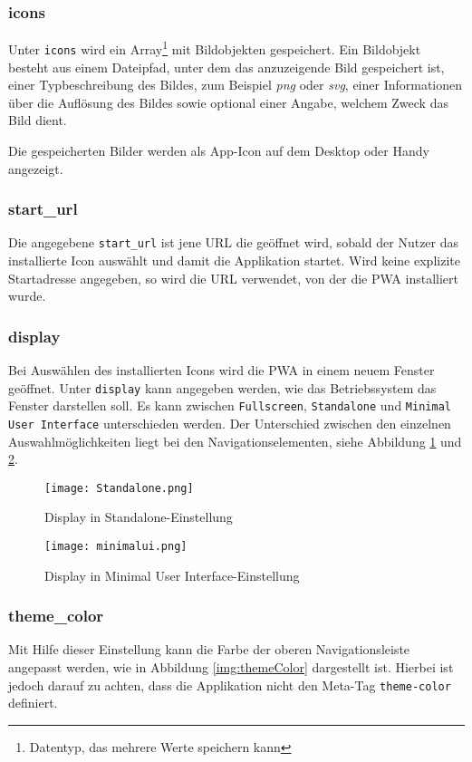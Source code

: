 \subsubsection{icons}
Unter \texttt{icons} wird ein Array\footnote{Datentyp, das mehrere Werte speichern kann} mit Bildobjekten gespeichert. Ein Bildobjekt besteht aus einem Dateipfad, unter dem das anzuzeigende Bild gespeichert ist, einer Typbeschreibung des Bildes, zum Beispiel \textit{png} oder \textit{svg}, einer Informationen über die Auflösung des Bildes sowie optional einer Angabe, welchem Zweck das Bild dient. 

Die gespeicherten Bilder werden als App-Icon auf dem Desktop oder Handy angezeigt. 

\subsubsection{start\_url}
Die angegebene \texttt{start\_url} ist jene \ac{URL} die geöffnet wird, sobald der Nutzer das installierte Icon auswählt und damit die Applikation startet. 
Wird keine explizite Startadresse angegeben, so wird die URL verwendet, von der die PWA installiert wurde. 

\subsubsection{display}

Bei Auswählen des installierten Icons wird die PWA in einem neuem Fenster geöffnet. Unter \texttt{display} kann angegeben werden, wie das Betriebssystem das Fenster darstellen soll. 
Es kann zwischen \texttt{Fullscreen}, \texttt{Standalone} und \texttt{Minimal User Interface} unterschieden werden. 
Der Unterschied zwischen den einzelnen Auswahlmöglichkeiten liegt bei den Navigationselementen, siehe Abbildung \ref{img:Standalone} und \ref{img:minimalui}.

\begin{figure}[!htb]
    \texttt{[image: Standalone.png]}
    \caption{Display in \glqq Standalone\grqq{}-Einstellung}
    \label{img:Standalone}
\end{figure}


\begin{figure}[!htb]
    \texttt{[image: minimalui.png]}
    \caption{Display in \glqq Minimal User Interface\grqq{}-Einstellung}
    \label{img:minimalui}
\end{figure}

\subsubsection{theme\_color}
Mit Hilfe dieser Einstellung kann die Farbe der oberen Navigationsleiste angepasst werden, wie in Abbildung \ref{img:themeColor} dargestellt ist. Hierbei ist jedoch darauf zu achten, dass die Applikation nicht den Meta-Tag \texttt{theme-color} definiert. 

